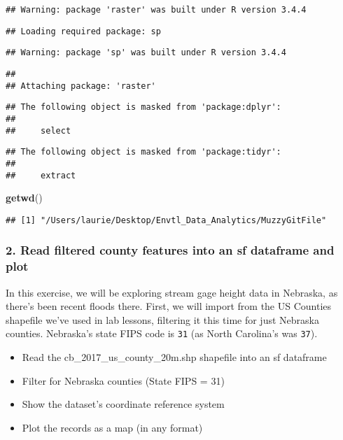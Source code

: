 \documentclass[]{article}
\newenvironment{Shaded}{\begin{snugshade}}{\end{snugshade}}
\newcommand{\KeywordTok}[1]{\textcolor[rgb]{0.13,0.29,0.53}{\textbf{#1}}}
\newcommand{\NormalTok}[1]{#1}
\providecommand{\tightlist}{%
  \setlength{\itemsep}{0pt}\setlength{\parskip}{0pt}}
\begin{document}
\begin{verbatim}
## Warning: package 'raster' was built under R version 3.4.4
\end{verbatim}

\begin{verbatim}
## Loading required package: sp
\end{verbatim}

\begin{verbatim}
## Warning: package 'sp' was built under R version 3.4.4
\end{verbatim}

\begin{verbatim}
## 
## Attaching package: 'raster'
\end{verbatim}

\begin{verbatim}
## The following object is masked from 'package:dplyr':
## 
##     select
\end{verbatim}

\begin{verbatim}
## The following object is masked from 'package:tidyr':
## 
##     extract
\end{verbatim}

\begin{Shaded}
\begin{Highlighting}[]
\KeywordTok{getwd}\NormalTok{()}
\end{Highlighting}
\end{Shaded}

\begin{verbatim}
## [1] "/Users/laurie/Desktop/Envtl_Data_Analytics/MuzzyGitFile"
\end{verbatim}

\subsubsection{2. Read filtered county features into an sf dataframe and
plot}\label{read-filtered-county-features-into-an-sf-dataframe-and-plot}

In this exercise, we will be exploring stream gage height data in
Nebraska, as there's been recent floods there. First, we will import
from the US Counties\\
shapefile we've used in lab lessons, filtering it this time for just
Nebraska counties. Nebraska's state FIPS code is \texttt{31} (as North
Carolina's was \texttt{37}).

\begin{itemize}
\tightlist
\item
  Read the cb\_2017\_us\_county\_20m.shp shapefile into an sf dataframe
\item
  Filter for Nebraska counties (State FIPS = 31)
\item
  Show the dataset's coordinate reference system
\item
  Plot the records as a map (in any format)
\end{itemize}
\end{document}
